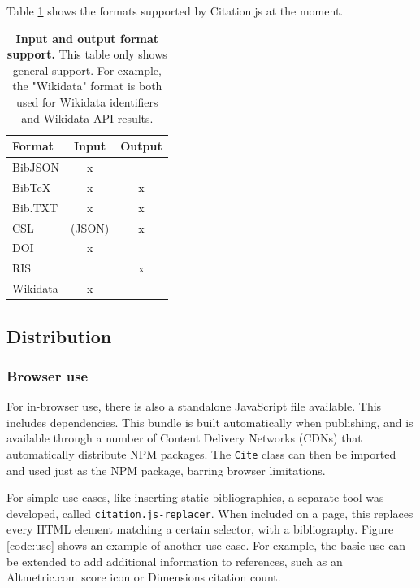 \documentclass[fleqn,10pt,lineno]{wlpeerj} %
\begin{document}
Table \ref{table:support} shows the formats supported by Citation.js at the moment.

\begin{table}[ht]
\caption{\textbf{Input and output format support.}
This table only shows general support. For example, the "Wikidata" format is both used for Wikidata identifiers and Wikidata API results.}
\label{table:support}
\begin{tabular}{|l|c|c|}
\hline
\textbf{Format} & \textbf{Input} & \textbf{Output} \\ \hline
BibJSON         & x              &                 \\ \hline
BibTeX          & x              & x               \\ \hline
Bib.TXT         & x              & x               \\ \hline
CSL             & (JSON)   & x               \\ \hline
DOI             & x              &                 \\ \hline
RIS             &                & x               \\ \hline
Wikidata        & x              &                 \\ \hline
\end{tabular}
\end{table}

\subsection*{Distribution}

\subsubsection*{Browser use}

For in-browser use, there is also a standalone JavaScript file available. This includes dependencies. This bundle is built automatically when publishing, and is available through a number of Content Delivery Networks (CDNs) that automatically distribute NPM packages. The \texttt{Cite} class can then be imported and used just as the NPM package, barring browser limitations.

For simple use cases, like inserting static bibliographies, a separate tool was developed, called \texttt{citation.js-replacer}. When included on a page, this replaces every HTML element matching a certain selector, with a bibliography. Figure \ref{code:use} shows an example of another use case. For example, the basic use can be extended to add additional information to references, such as an Altmetric.com score icon or Dimensions citation count.
\end{document}
